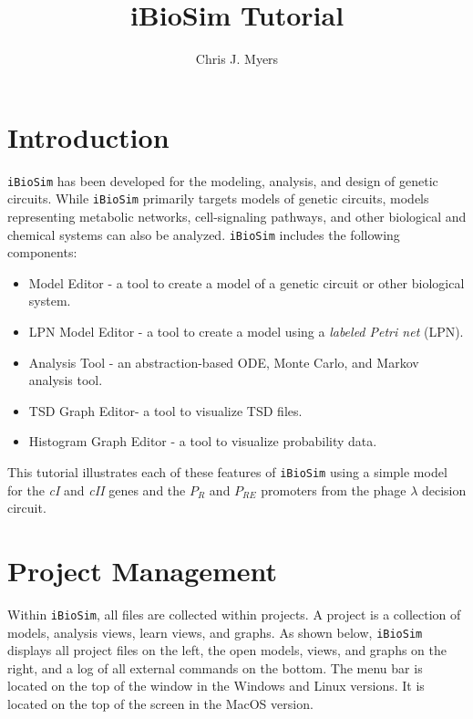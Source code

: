 \documentclass[titlepage,11pt]{article}
\title{iBioSim Tutorial}
\author{Chris J. Myers}
\begin{document}
\maketitle

  
\tableofcontents

\clearpage
  

\section{Introduction}

\noindent
{\tt iBioSim} has been developed for the modeling, analysis, and design of genetic circuits.  While {\tt iBioSim} primarily targets models of genetic circuits, models representing metabolic networks, cell-signaling pathways, and other biological and chemical systems can also be analyzed.  {\tt iBioSim} includes the following components: 

\begin{itemize}
\item Model Editor - a tool to create a model of a genetic circuit or other biological system.
\item LPN Model Editor - a tool to create a model using a \emph{labeled Petri net} (LPN).
\item Analysis Tool - an abstraction-based ODE, Monte Carlo, and Markov analysis tool.
\item TSD Graph Editor- a tool to visualize TSD files. 
\item Histogram Graph Editor - a tool to visualize probability data. 
\end{itemize}

This tutorial illustrates each of these features of {\tt iBioSim} using a simple model for the \emph{cI} and \emph{cII} genes and the $P_R$ and $P_{RE}$ promoters from the phage $\lambda$ decision circuit.  


\section{Project Management}

\noindent
Within {\tt iBioSim}, all files are collected within projects.   A project is a collection of models, analysis views, learn views, and graphs.  As shown below, {\tt iBioSim} displays all project files on the left, the open models, views, and graphs on the right, and a log of all external commands on the bottom.  The menu bar is located on the top of the window in the Windows and Linux versions.  It is located on the top of the screen in the MacOS version.
\end{document}
